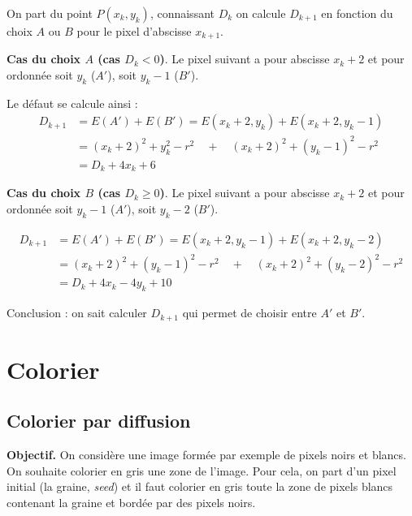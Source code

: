 \documentclass[11pt,class=report,crop=false]{standalone}
\begin{document}
\begin{itemize}
On part du point $P(x_k,y_k)$, connaissant $D_k$ on calcule $D_{k+1}$ en fonction du choix $A$ ou $B$ pour le pixel d'abscisse $x_{k+1}$.




\textbf{Cas du choix $A$ (cas $D_k<0$)}.
Le pixel suivant a pour abscisse $x_k+2$ et pour ordonnée soit $y_k$ ($A'$), soit $y_k-1$ ($B'$).



Le défaut se calcule ainsi :
\begin{align*}
	D_{k+1} 
	&= E(A') + E(B') = E(x_k+2,y_k)+E(x_k+2,y_k-1) \\
	&=  (x_k + 2)^2 + y_k^2-r^2 \quad + \quad  (x_k + 2)^2 + (y_k-1)^2-r^2\\
	&= D_k + 4x_k+6
\end{align*}

\textbf{Cas du choix $B$ (cas $D_k\ge0$)}.	
Le pixel suivant a pour abscisse $x_k+2$ et pour ordonnée soit $y_k-1$ ($A'$), soit $y_k-2$ ($B'$).



\begin{align*}
	D_{k+1} 
	&= E(A') + E(B') = E(x_k+2,y_k-1)+E(x_k+2,y_k-2) \\
	&=  (x_k + 2)^2 + (y_k-1)^2-r^2 \quad + \quad  (x_k + 2)^2 + (y_k-2)^2-r^2\\
	&= D_k + 4x_k-4y_k+10
\end{align*}

Conclusion : on sait calculer $D_{k+1}$ qui permet de choisir entre $A'$ et $B'$.

\end{itemize}



\section{Colorier}


\subsection{Colorier par diffusion}

\textbf{Objectif.} On considère une image formée par exemple de pixels noirs et blancs.
On souhaite colorier en gris une zone de l'image.
Pour cela, on part d'un pixel initial (la graine, \emph{seed}) et il faut colorier en gris toute la zone de pixels blancs contenant la graine et bordée par des pixels noirs.
\end{document}
